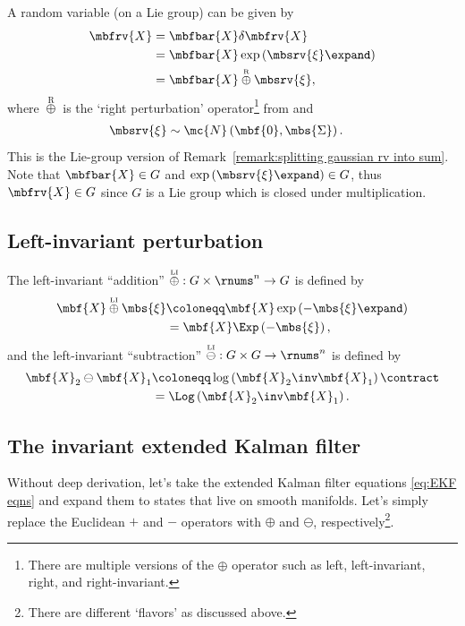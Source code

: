\documentclass[nobib]{tufte-handout}
\newcommand{\liplus}{\overset{{\scriptscriptstyle\mathrm{LI}}}{\oplus}}
\newcommand{\rplus}{\overset{{\scriptscriptstyle\mathrm{R}}}{\oplus}}
\newcommand{\liminus}{\overset{{\scriptscriptstyle\mathrm{LI}}}{\ominus}}
\begin{document}
    
    A random variable (on a Lie group) can be given by
    \begin{align}
        \mbfrv{X} &= \mbfbar{X}\delta\mbfrv{X}\\
        &= \mbfbar{X}\exp\left( \mbsrv{\xi}\expand \right)\\
        &= \mbfbar{X} \rplus \mbsrv{\xi},
    \end{align}
    where $\rplus$ is the `right perturbation' operator\footnote{There are multiple versions of the $\oplus$ operator such as left, left-invariant, right, and right-invariant.} from
     \cite{Sola_micro_2019} and
    \begin{align}
        \mbsrv{\xi} &\sim \mc{N}\left( \mbf{0}, \mbs{\Sigma} \right).
    \end{align}
    This is the Lie-group version of Remark~\ref{remark:splitting gaussian rv into sum}. Note that $\mbfbar{X}\in G$ and $\exp\left( \mbsrv{\xi}\expand \right)\in G$, thus $\mbfrv{X}\in G$ since $G$ is a Lie group which is closed under multiplication.

    \subsection{Left-invariant perturbation}
    The left-invariant ``addition'' $\liplus : G \times \rnums^{n} \to G$ is defined by
    \begin{align}
        \mbf{X}\liplus\mbs{\xi} 
        &\coloneqq \mbf{X}\exp\left( -\mbs{\xi}\expand \right)\\
        &= \mbf{X}\Exp\left( -\mbs{\xi} \right),
    \end{align}
    and the left-invariant ``subtraction'' $\liminus : G \times G \to \rnums^{n}$ is defined by
    \begin{align}
        \mbf{X}_{2}\ominus\mbf{X}_{1} 
        &\coloneqq \log\left(\mbf{X}_{2}\inv\mbf{X}_{1}\right)\contract\\
        &= \Log\left(\mbf{X}_{2}\inv\mbf{X}_{1}\right).
    \end{align}

    \subsection{The invariant extended Kalman filter}
    Without deep derivation, let's take the extended Kalman filter equations \eqref{eq:EKF eqns} and expand them to states that live on smooth manifolds. Let's simply replace the Euclidean $+$ and $-$ operators with $\oplus$ and $\ominus$, respectively\footnote{There are different `flavors' as discussed above.}. 
    
\end{document}
